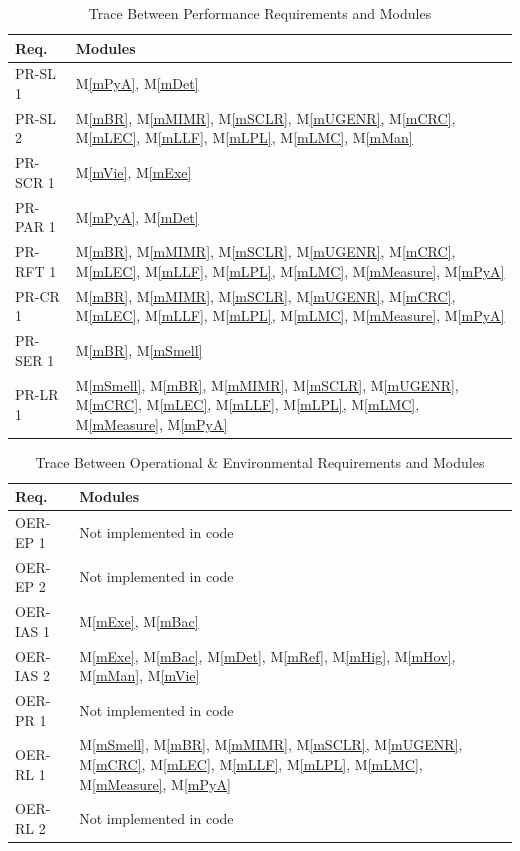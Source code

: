 \documentclass[12pt, titlepage]{article}
\newcommand{\mref}[1]{M\ref{#1}}
\begin{document}
\begin{table}[H]
  \centering
  \begin{tabular}{p{} p{}}
    \toprule \textbf{Req.} & \textbf{Modules}\\
    \midrule
    PR-SL 1 & \mref{mPyA}, \mref{mDet}\\
    PR-SL 2 & \mref{mBR}, \mref{mMIMR}, \mref{mSCLR}, \mref{mUGENR}, \mref{mCRC}, \mref{mLEC}, \mref{mLLF}, \mref{mLPL}, \mref{mLMC}, \mref{mMan} \\
    
    PR-SCR 1 & \mref{mVie}, \mref{mExe} \\ 

    PR-PAR 1 & \mref{mPyA}, \mref{mDet} \\ 
    
    PR-RFT 1 & \mref{mBR}, \mref{mMIMR}, \mref{mSCLR}, \mref{mUGENR}, \mref{mCRC}, \mref{mLEC}, \mref{mLLF}, \mref{mLPL}, \mref{mLMC}, \mref{mMeasure}, \mref{mPyA}\\ 
    
    PR-CR 1 & \mref{mBR}, \mref{mMIMR}, \mref{mSCLR}, \mref{mUGENR}, \mref{mCRC}, \mref{mLEC}, \mref{mLLF}, \mref{mLPL}, \mref{mLMC}, \mref{mMeasure}, \mref{mPyA} \\ 
    
    PR-SER 1 & \mref{mBR}, \mref{mSmell}\\ 

    PR-LR 1 & \mref{mSmell}, \mref{mBR}, \mref{mMIMR}, \mref{mSCLR}, \mref{mUGENR}, \mref{mCRC}, \mref{mLEC}, \mref{mLLF}, \mref{mLPL}, \mref{mLMC}, \mref{mMeasure}, \mref{mPyA}\\
    \bottomrule
  \end{tabular}
  \caption{Trace Between Performance Requirements and Modules}
  \label{tab:PR-mod}
\end{table}

\begin{table}[H]
  \centering
  \begin{tabular}{p{} p{}}
    \toprule \textbf{Req.} & \textbf{Modules}\\
    \midrule
    OER-EP 1 & Not implemented in code \\
    OER-EP 2 & Not implemented in code \\
    OER-IAS 1 & \mref{mExe}, \mref{mBac} \\
    OER-IAS 2 & \mref{mExe}, \mref{mBac}, \mref{mDet}, \mref{mRef}, \mref{mHig}, \mref{mHov}, \mref{mMan}, \mref{mVie} \\
    OER-PR 1 & Not implemented in code \\
    OER-RL 1 & \mref{mSmell}, \mref{mBR}, \mref{mMIMR}, \mref{mSCLR}, \mref{mUGENR}, \mref{mCRC}, \mref{mLEC}, \mref{mLLF}, \mref{mLPL}, \mref{mLMC}, \mref{mMeasure}, \mref{mPyA}\\
    OER-RL 2 & Not implemented in code \\
    \bottomrule
  \end{tabular}
  \caption{Trace Between Operational \& Environmental Requirements and Modules}
  \label{tab:OPE-mod}
\end{table}
\end{document}
